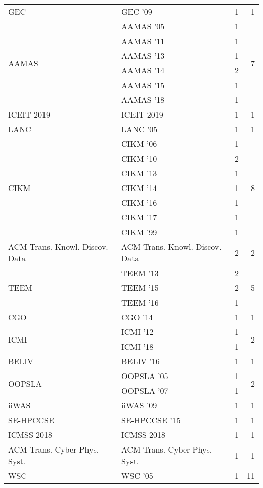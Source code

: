 \begin{table*}[t]
\begin{tabular}{llrr}
\multirow{1}{*}{GEC } & GEC '09 & 1 & \multirow{1}{*}{1}\\
\multirow{6}{*}{AAMAS } & AAMAS '05 & 1 & \multirow{6}{*}{7}\\
& AAMAS '11 & 1 &\\
& AAMAS '13 & 1 &\\
& AAMAS '14 & 2 &\\
& AAMAS '15 & 1 &\\
& AAMAS '18 & 1 &\\
\multirow{1}{*}{ICEIT 2019} & ICEIT 2019 & 1 & \multirow{1}{*}{1}\\
\multirow{1}{*}{LANC } & LANC '05 & 1 & \multirow{1}{*}{1}\\
\multirow{7}{*}{CIKM } & CIKM '06 & 1 & \multirow{7}{*}{8}\\
& CIKM '10 & 2 &\\
& CIKM '13 & 1 &\\
& CIKM '14 & 1 &\\
& CIKM '16 & 1 &\\
& CIKM '17 & 1 &\\
& CIKM '99 & 1 &\\
\multirow{1}{*}{ACM Trans. Knowl. Discov. Data} & ACM Trans. Knowl. Discov. Data & 2 & \multirow{1}{*}{2}\\
\multirow{3}{*}{TEEM } & TEEM '13 & 2 & \multirow{3}{*}{5}\\
& TEEM '15 & 2 &\\
& TEEM '16 & 1 &\\
\multirow{1}{*}{CGO } & CGO '14 & 1 & \multirow{1}{*}{1}\\
\multirow{2}{*}{ICMI } & ICMI '12 & 1 & \multirow{2}{*}{2}\\
& ICMI '18 & 1 &\\
\multirow{1}{*}{BELIV } & BELIV '16 & 1 & \multirow{1}{*}{1}\\
\multirow{2}{*}{OOPSLA } & OOPSLA '05 & 1 & \multirow{2}{*}{2}\\
& OOPSLA '07 & 1 &\\
\multirow{1}{*}{iiWAS } & iiWAS '09 & 1 & \multirow{1}{*}{1}\\
\multirow{1}{*}{SE-HPCCSE } & SE-HPCCSE '15 & 1 & \multirow{1}{*}{1}\\
\multirow{1}{*}{ICMSS 2018} & ICMSS 2018 & 1 & \multirow{1}{*}{1}\\
\multirow{1}{*}{ACM Trans. Cyber-Phys. Syst.} & ACM Trans. Cyber-Phys. Syst. & 1 & \multirow{1}{*}{1}\\
\multirow{9}{*}{WSC } & WSC '05 & 1 & \multirow{9}{*}{11}\\

\end{tabular}
\end{table*}
